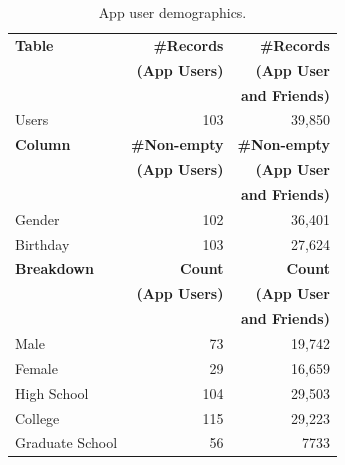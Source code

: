 \begin{table}
\centering
\begin{tabular}{|>{\small}p{2cm}|>{\small}r|>{\small}r|}
\hline
\textbf{Table} & \textbf{\#Records} & \textbf{\#Records} \\
& \textbf{(App Users)} & \textbf{(App User} \\
& & \textbf{and Friends)} \\
\hline
Users & 103 & 39,850 \\
\hline
\hline
\textbf{Column} & \textbf{\#Non-empty} & \textbf{\#Non-empty} \\
& \textbf{(App Users)} & \textbf{(App User} \\
& & \textbf{and Friends)} \\
\hline
Gender & 102 & 36,401 \\
\hline
Birthday & 103 & 27,624 \\
\hline
\hline
\textbf{Breakdown} & \textbf{Count} & \textbf{Count} \\
& \textbf{(App Users)} & \textbf{(App User} \\
& & \textbf{and Friends)} \\
\hline
Male & 73 & 19,742 \\
\hline
Female & 29 & 16,659 \\
\hline
High School & 104 & 29,503 \\
\hline
College & 115 & 29,223 \\
\hline
Graduate School & 56 & 7733 \\
\hline
\end{tabular}
\caption{App user demographics.}
\label{tab:demographics}
\end{table}


